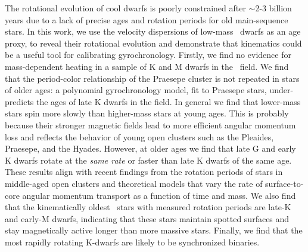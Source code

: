 
The rotational evolution of cool dwarfs is poorly constrained after $\sim$2-3
billion years due to a lack of precise ages and rotation periods for old
main-sequence stars.
In this work, we use the velocity dispersions of low-mass \kepler\ dwarfs as
an age proxy, to reveal their rotational evolution and demonstrate that
kinematics could be a useful tool for calibrating gyrochronology.
Firstly, we find no evidence for mass-dependent heating in a sample of K and M
dwarfs in the \kepler\ field.
We find that the period-color relationship of the Praesepe cluster is not
repeated in stars of older ages: a polynomial gyrochronology model, fit to
Praesepe stars, under-predicts the ages of late K dwarfs in the field.
In general we find that lower-mass stars spin more slowly than higher-mass
stars at young ages.
This is probably because their stronger magnetic fields lead to more efficient
angular momentum loss and reflects the behavior of young open clusters such as
the Pleaides, Praesepe, and the Hyades.
However, at older ages we find that late G and early K dwarfs rotate at the
{\it same rate} or faster than late K dwarfs of the same age.
These results align with recent findings from the rotation periods of stars in
middle-aged open clusters and theoretical models that vary the rate of
surface-to-core angular momentum transport as a function of time and mass.
We also find that the kinematically oldest \kepler\ stars with measured
rotation periods are late-K and early-M dwarfs, indicating that these stars
maintain spotted surfaces and stay magnetically active longer than more
massive stars.
Finally, we find that the most rapidly rotating K-dwarfs are likely to be
synchronized binaries.

